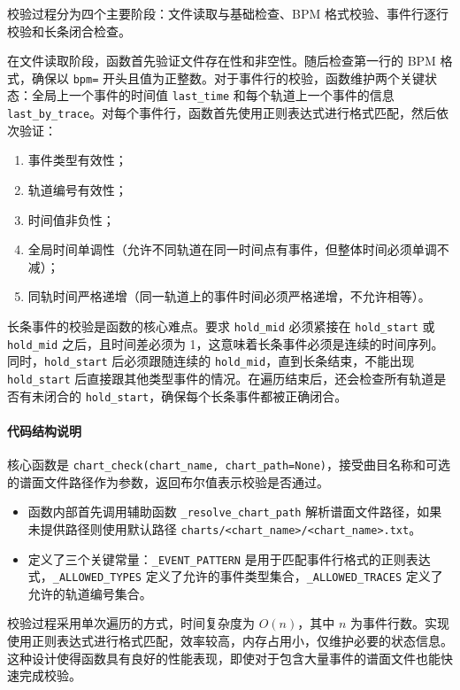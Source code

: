 \documentclass[12pt, a4paper]{article}
\begin{document}
校验过程分为四个主要阶段：文件读取与基础检查、BPM 格式校验、事件行逐行校验和长条闭合检查。

在文件读取阶段，函数首先验证文件存在性和非空性。随后检查第一行的 BPM 格式，确保以 \texttt{bpm=} 开头且值为正整数。对于事件行的校验，函数维护两个关键状态：全局上一个事件的时间值 \texttt{last\_time} 和每个轨道上一个事件的信息 \texttt{last\_by\_trace}。对每个事件行，函数首先使用正则表达式进行格式匹配，然后依次验证：
\begin{enumerate}
    \item 事件类型有效性；
    \item 轨道编号有效性；
    \item 时间值非负性；
    \item 全局时间单调性（允许不同轨道在同一时间点有事件，但整体时间必须单调不减）；
    \item 同轨时间严格递增（同一轨道上的事件时间必须严格递增，不允许相等）。
\end{enumerate}

长条事件的校验是函数的核心难点。要求 \texttt{hold\_mid} 必须紧接在 \texttt{hold\_start} 或 \texttt{hold\_mid} 之后，且时间差必须为 1，这意味着长条事件必须是连续的时间序列。同时，\texttt{hold\_start} 后必须跟随连续的 \texttt{hold\_mid}，直到长条结束，不能出现 \texttt{hold\_start} 后直接跟其他类型事件的情况。在遍历结束后，还会检查所有轨道是否有未闭合的 \texttt{hold\_start}，确保每个长条事件都被正确闭合。

\paragraph{代码结构说明}
核心函数是 \texttt{chart\_check(chart\_name, chart\_path=None)}，接受曲目名称和可选的谱面文件路径作为参数，返回布尔值表示校验是否通过。
\begin{itemize}
    \item 函数内部首先调用辅助函数 \texttt{\_resolve\_chart\_path} 解析谱面文件路径，如果未提供路径则使用默认路径 \texttt{charts/<chart\_name>/<chart\_name>.txt}。
    \item 定义了三个关键常量：\texttt{\_EVENT\_PATTERN} 是用于匹配事件行格式的正则表达式，\texttt{\_ALLOWED\_TYPES} 定义了允许的事件类型集合，\texttt{\_ALLOWED\_TRACES} 定义了允许的轨道编号集合。
\end{itemize}

校验过程采用单次遍历的方式，时间复杂度为 $O(n)$，其中 $n$ 为事件行数。实现使用正则表达式进行格式匹配，效率较高，内存占用小，仅维护必要的状态信息。这种设计使得函数具有良好的性能表现，即使对于包含大量事件的谱面文件也能快速完成校验。
\end{document}
